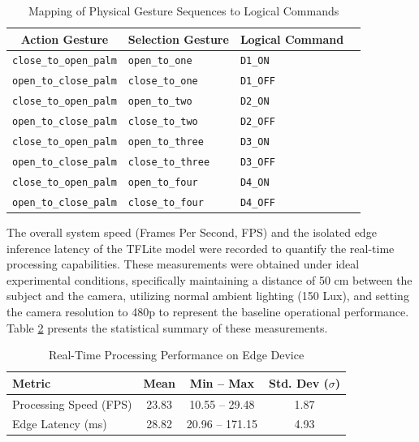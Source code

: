 \begin{table}[htbp]
\caption{Mapping of Physical Gesture Sequences to Logical Commands}
\label{tab:logical_mapping}
\centering
\begin{tabular}{c l l c}
\hline
\hline
\textbf{Action Gesture} & \textbf{Selection Gesture} & \textbf{Logical Command} \\
\hline
\texttt{close\_to\_open\_palm} & \texttt{open\_to\_one}   & \texttt{D1\_ON} \\
\texttt{open\_to\_close\_palm} & \texttt{close\_to\_one}  & \texttt{D1\_OFF} \\
\texttt{close\_to\_open\_palm} & \texttt{open\_to\_two}   & \texttt{D2\_ON} \\
\texttt{open\_to\_close\_palm} & \texttt{close\_to\_two}  & \texttt{D2\_OFF} \\
\texttt{close\_to\_open\_palm} & \texttt{open\_to\_three} & \texttt{D3\_ON} \\
\texttt{open\_to\_close\_palm} & \texttt{close\_to\_three} & \texttt{D3\_OFF} \\
\texttt{close\_to\_open\_palm} & \texttt{open\_to\_four}  & \texttt{D4\_ON} \\
\texttt{open\_to\_close\_palm} & \texttt{close\_to\_four} & \texttt{D4\_OFF} \\
\hline
\end{tabular}
\end{table}


The overall system speed (Frames Per Second, FPS) and the isolated edge inference latency of the TFLite model were recorded to quantify the real-time processing capabilities. These measurements were obtained under ideal experimental conditions, specifically maintaining a distance of 50 cm between the subject and the camera, utilizing normal ambient lighting (150 Lux), and setting the camera resolution to 480p to represent the baseline operational performance. Table \ref{tab:edge_speed} presents the statistical summary of these measurements.

\begin{table}[htbp]
\caption{Real-Time Processing Performance on Edge Device}
\label{tab:edge_speed}
\centering
\begin{tabular}{l c c c}
\hline
\hline
\textbf{Metric} & \textbf{Mean} & \textbf{Min -- Max} & \textbf{Std. Dev ($\sigma$)} \\
\hline
Processing Speed (FPS) & 23.83 & 10.55 -- 29.48 & 1.87 \\
Edge Latency (ms) & 28.82 & 20.96 -- 171.15 & 4.93 \\
\hline
\end{tabular}
\end{table}

